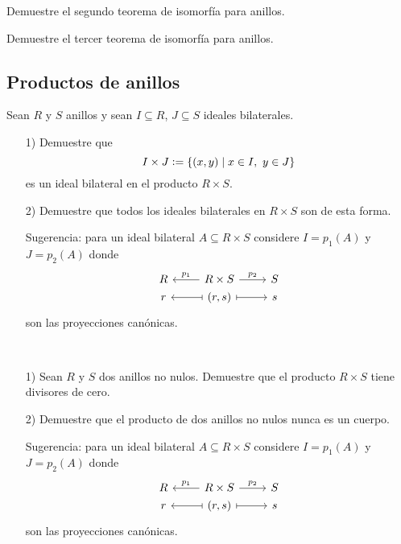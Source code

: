 \begin{ejercicio}
  Demuestre el segundo teorema de isomorfía para anillos.
\end{ejercicio}

\begin{ejercicio}
  Demuestre el tercer teorema de isomorfía para anillos.
\end{ejercicio}

\subsection*{Productos de anillos}

\begin{ejercicio}
  Sean $R$ y $S$ anillos y sean $I \subseteq R$, $J \subseteq S$ ideales
  bilaterales.

  \begin{enumerate}
  \item[1)] Demuestre que
    $$I\times J \mathrel{\mathop:}= \{ (x,y) \mid x\in I, ~ y\in J \}$$
    es un ideal bilateral en el producto $R\times S$.

  \item[2)] Demuestre que todos los ideales bilaterales en $R\times S$ son
    de esta forma.

    Sugerencia: para un ideal bilateral $A \subseteq R\times S$ considere
    $I = p_1 (A)$ y $J = p_2 (A)$ donde
    $$\begin{tikzcd}[row sep=0pt]
      R & R\times S\ar{l}[swap]{p_1}\ar{r}{p_2} & S \\
      r & (r,s) \ar[|->]{l}\ar[|->]{r} & s
    \end{tikzcd}$$
    son las proyecciones canónicas.
  \end{enumerate}
\end{ejercicio}

\begin{ejercicio}
  ~

  \begin{enumerate}
  \item[1)] Sean $R$ y $S$ dos anillos no nulos. Demuestre que el producto
    $R\times S$ tiene divisores de cero.

  \item[2)] Demuestre que el producto de dos anillos no nulos nunca es
    un cuerpo.

    Sugerencia: para un ideal bilateral $A \subseteq R\times S$ considere
    $I = p_1 (A)$ y $J = p_2 (A)$ donde
    $$\begin{tikzcd}[row sep=0pt]
      R & R\times S\ar{l}[swap]{p_1}\ar{r}{p_2} & S \\
      r & (r,s) \ar[|->]{l}\ar[|->]{r} & s
    \end{tikzcd}$$
    son las proyecciones canónicas.
  \end{enumerate}
\end{ejercicio}

